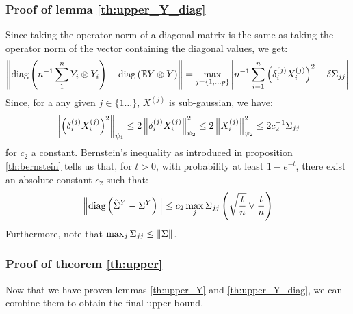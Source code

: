 \documentclass{article}
\numberwithin{equation}{section}
\numberwithin{equation}{section}
\begin{document}
    \subsubsection{Proof of lemma \ref{th:upper_Y_diag}}
    
        Since taking the operator norm of a diagonal matrix is the same as taking the operator norm of the vector containing the diagonal values, we get:
        \begin{equation}
            \left\Vert \text{diag} \left(n^{-1}\sum_1^n Y_i \otimes Y_i \right) - \text{diag}\left( \mathbb{E} Y \otimes Y \right) \right\Vert = \max_{j=\lbrace 1, \dots p\rbrace} \left\vert n^{-1}\sum_{i=1}^n \left(\delta_i^{(j)} X_i^{(j)}\right)^2 - \delta\Sigma_{jj}\right\vert
        \end{equation}
        Since, for a any given $j\in \lbrace 1 \dots \rbrace$, $X^{(j)}$ is sub-gaussian, we have:
        \begin{equation}
        \left\Vert \left(\delta_i^{(j)} X_i^{(j)}\right)^2 \right\Vert_{\psi_{1}} \leq 2 \left\Vert \delta_i^{(j)} X_i^{(j)} \right\Vert_{\psi_{2}}^2 \leq 2 \left\Vert X_i^{(j)} \right\Vert_{\psi_{2}}^2 \leq 2c_2^{-1} \Sigma_{jj}
        \end{equation}
        for $c_2$ a constant. Bernstein's inequality as introduced in proposition \ref{th:bernstein} tells us that, for $t>0$, with probability at least $1-e^{-t}$, there exist an absolute constant $c_2$ such that:
        \begin{equation}
        \left\Vert \text{diag}\left(\hat{\Sigma}^Y - \Sigma^Y\right) \right\Vert \leq c_2 \max_j \Sigma_{jj} \left(\sqrt{\frac{t}{n}} \lor \frac{t}{n}\right)
        \end{equation}
        Furthermore, note that $\max_j \Sigma_{jj} \leq \left\Vert \Sigma \right\Vert$.
        
    \subsubsection{Proof of theorem \ref{th:upper}}
    
        Now that we have proven lemmas \ref{th:upper_Y} and \ref{th:upper_Y_diag}, we can combine them to obtain the final upper bound.
        
\end{document}
